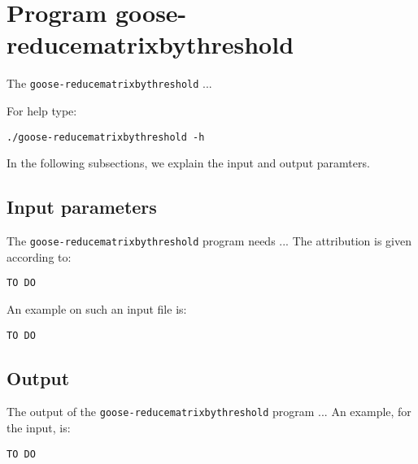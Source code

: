 \section{Program goose-reducematrixbythreshold}
The \texttt{goose-reducematrixbythreshold} ...

For help type:
\begin{lstlisting}
./goose-reducematrixbythreshold -h
\end{lstlisting}
In the following subsections, we explain the input and output paramters.

\subsection{Input parameters}

The \texttt{goose-reducematrixbythreshold} program needs ...
The attribution is given according to:
\begin{lstlisting}
TO DO
\end{lstlisting}

An example on such an input file is:
\begin{lstlisting}
TO DO
\end{lstlisting}

\subsection{Output}
The output of the \texttt{goose-reducematrixbythreshold} program ...
An example, for the input, is:
\begin{lstlisting}
TO DO
\end{lstlisting}
